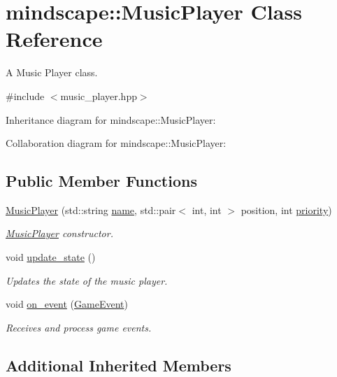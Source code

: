 \hypertarget{classmindscape_1_1_music_player}{}\section{mindscape\+:\+:Music\+Player Class Reference}
\label{classmindscape_1_1_music_player}


A Music Player class.  




{\ttfamily \#include $<$music\+\_\+player.\+hpp$>$}



Inheritance diagram for mindscape\+:\+:Music\+Player\+:


Collaboration diagram for mindscape\+:\+:Music\+Player\+:
\subsection*{Public Member Functions}
\begin{DoxyCompactItemize}
\item 
\hyperlink{classmindscape_1_1_music_player_a98268fcd0769466ccabef1b386be9cac}{Music\+Player} (std\+::string \hyperlink{classengine_1_1_game_object_a1f104f7af4f351e6d3278319762c9fe5}{name}, std\+::pair$<$ int, int $>$ position, int \hyperlink{classengine_1_1_game_object_a159ecaca30229e302793b11a75bd13c2}{priority})
\begin{DoxyCompactList}\small\item\em \hyperlink{classmindscape_1_1_music_player}{Music\+Player} constructor. \end{DoxyCompactList}\item 
void \hyperlink{classmindscape_1_1_music_player_a21aa157610534ba64c9f87f7836cb9d9}{update\+\_\+state} ()
\begin{DoxyCompactList}\small\item\em Updates the state of the music player. \end{DoxyCompactList}\item 
void \hyperlink{classmindscape_1_1_music_player_a865555fc70044d188a23ec2e9da94037}{on\+\_\+event} (\hyperlink{class_game_event}{Game\+Event})
\begin{DoxyCompactList}\small\item\em Receives and process game events. \end{DoxyCompactList}\end{DoxyCompactItemize}
\subsection*{Additional Inherited Members}


